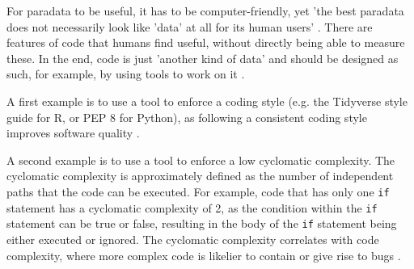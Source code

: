 For paradata to be useful, it has to be computer-friendly, yet 
'the best paradata does not necessarily look like 'data' at all for its
human users' \cite{huvila2022improving}.
There are features of code that humans find useful,
without directly being able to measure these.
In the end, code is just 'another kind of data' and should be designed 
as such, for example, by using tools to work on it \cite{wilson2022twelve}.


A first example is to use a tool to enforce a coding style 
(e.g. the Tidyverse style guide \cite{wickham2019advanced} for R,
or PEP 8 \cite{van2001pep} for Python),
as following a consistent coding style improves software quality \cite{fang2001}.


A second example is to use a tool to enforce a low cyclomatic complexity.
The cyclomatic complexity is approximately defined 
as the number of independent paths that
the code can be executed. 
For example, code that has only one \verb|if| statement
has a cyclomatic complexity of 2, as the condition within the \verb|if|
statement can be true or false,
resulting in the body of the \verb|if| statement being either
executed or ignored.
The cyclomatic complexity correlates with code complexity,
where more complex code is likelier to contain or give rise to bugs 
\cite{abd2018calculating,chen2019empirical,zimmermann2008predicting}.

